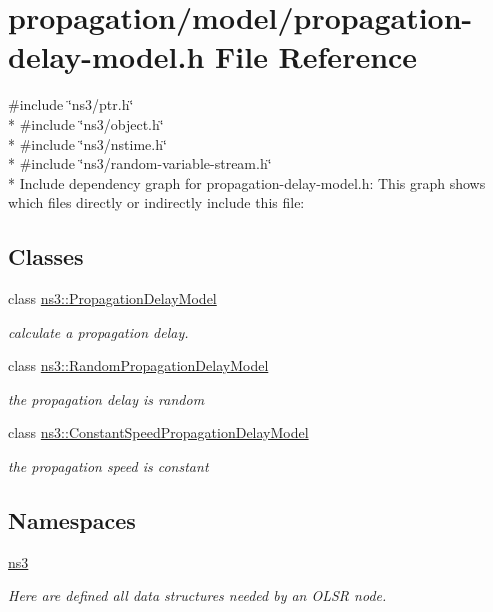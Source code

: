 \hypertarget{propagation-delay-model_8h}{}\section{propagation/model/propagation-\/delay-\/model.h File Reference}
\label{propagation-delay-model_8h}
{\ttfamily \#include \char`\"{}ns3/ptr.\+h\char`\"{}}\\*
{\ttfamily \#include \char`\"{}ns3/object.\+h\char`\"{}}\\*
{\ttfamily \#include \char`\"{}ns3/nstime.\+h\char`\"{}}\\*
{\ttfamily \#include \char`\"{}ns3/random-\/variable-\/stream.\+h\char`\"{}}\\*
Include dependency graph for propagation-\/delay-\/model.h\+:
This graph shows which files directly or indirectly include this file\+:
\subsection*{Classes}
\begin{DoxyCompactItemize}
\item 
class \hyperlink{classns3_1_1PropagationDelayModel}{ns3\+::\+Propagation\+Delay\+Model}
\begin{DoxyCompactList}\small\item\em calculate a propagation delay. \end{DoxyCompactList}\item 
class \hyperlink{classns3_1_1RandomPropagationDelayModel}{ns3\+::\+Random\+Propagation\+Delay\+Model}
\begin{DoxyCompactList}\small\item\em the propagation delay is random \end{DoxyCompactList}\item 
class \hyperlink{classns3_1_1ConstantSpeedPropagationDelayModel}{ns3\+::\+Constant\+Speed\+Propagation\+Delay\+Model}
\begin{DoxyCompactList}\small\item\em the propagation speed is constant \end{DoxyCompactList}\end{DoxyCompactItemize}
\subsection*{Namespaces}
\begin{DoxyCompactItemize}
\item 
 \hyperlink{namespacens3}{ns3}
\begin{DoxyCompactList}\small\item\em Here are defined all data structures needed by an O\+L\+SR node. \end{DoxyCompactList}\end{DoxyCompactItemize}
